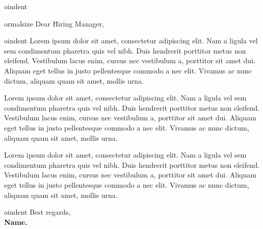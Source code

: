 \documentclass[a4paper,11pt]{letter}
\begin{document}
%
oindent


ormalsize Dear Hiring Manager,

\small 
oindent
Lorem ipsum dolor sit amet, consectetur adipiscing elit. Nam a ligula vel sem condimentum pharetra quis vel nibh. Duis hendrerit porttitor metus non eleifend. Vestibulum lacus enim, cursus nec vestibulum a, porttitor sit amet dui. Aliquam eget tellus in justo pellentesque commodo a nec elit. Vivamus ac nunc dictum, aliquam quam sit amet, mollis urna.

\vspace{1pt}
Lorem ipsum dolor sit amet, consectetur adipiscing elit. Nam a ligula vel sem condimentum pharetra quis vel nibh. Duis hendrerit porttitor metus non eleifend. Vestibulum lacus enim, cursus nec vestibulum a, porttitor sit amet dui. Aliquam eget tellus in justo pellentesque commodo a nec elit. Vivamus ac nunc dictum, aliquam quam sit amet, mollis urna.

\vspace{1pt}
Lorem ipsum dolor sit amet, consectetur adipiscing elit. Nam a ligula vel sem condimentum pharetra quis vel nibh. Duis hendrerit porttitor metus non eleifend. Vestibulum lacus enim, cursus nec vestibulum a, porttitor sit amet dui. Aliquam eget tellus in justo pellentesque commodo a nec elit. Vivamus ac nunc dictum, aliquam quam sit amet, mollis urna.


\bigskip

oindent
Best regards,\\
\textbf{Name.}
\end{document}
